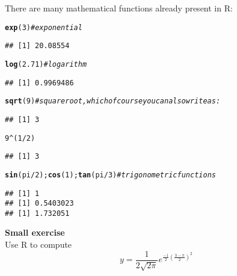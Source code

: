 \documentclass[12pt,a4paper]{scrartcl}\usepackage[]{graphicx}\usepackage[]{color}
\makeatletter
\newcommand{\hlnum}[1]{\textcolor[rgb]{0.686,0.059,0.569}{#1}}%
\newcommand{\hlcom}[1]{\textcolor[rgb]{0.678,0.584,0.686}{\textit{#1}}}%
\newcommand{\hlopt}[1]{\textcolor[rgb]{0,0,0}{#1}}%
\newcommand{\hlstd}[1]{\textcolor[rgb]{0.345,0.345,0.345}{#1}}%
\newcommand{\hlkwd}[1]{\textcolor[rgb]{0.737,0.353,0.396}{\textbf{#1}}}%
\newenvironment{kframe}{%
 \def\at@end@of@kframe{}%
 \ifinner\ifhmode%
  \def\at@end@of@kframe{\end{minipage}}%
  \begin{minipage}{\columnwidth}%
 \fi\fi%
 \def\FrameCommand##1{\hskip\@totalleftmargin \hskip-\fboxsep
 \colorbox{shadecolor}{##1}\hskip-\fboxsep
     \hskip-\linewidth \hskip-\@totalleftmargin \hskip\columnwidth}%
 \MakeFramed {\advance\hsize-\width
   \@totalleftmargin\z@ \linewidth\hsize
   \@setminipage}}%
 {\par\unskip\endMakeFramed%
 \at@end@of@kframe}
\newenvironment{knitrout}{}{} %
\makeatother
\begin{document}
There are many mathematical functions already present in R:
\begin{knitrout}
\color{fgcolor}\begin{kframe}
\begin{alltt}
\hlkwd{exp}\hlstd{(}\hlnum{3}\hlstd{)} \hlcom{#exponential}
\end{alltt}
\begin{verbatim}
## [1] 20.08554
\end{verbatim}
\begin{alltt}
\hlkwd{log}\hlstd{(}\hlnum{2.71}\hlstd{)} \hlcom{#logarithm}
\end{alltt}
\begin{verbatim}
## [1] 0.9969486
\end{verbatim}
\begin{alltt}
\hlkwd{sqrt}\hlstd{(}\hlnum{9}\hlstd{)} \hlcom{#square root, which of course you can also write as:}
\end{alltt}
\begin{verbatim}
## [1] 3
\end{verbatim}
\begin{alltt}
\hlnum{9} \hlopt{^} \hlstd{(}\hlnum{1}\hlopt{/}\hlnum{2}\hlstd{)}
\end{alltt}
\begin{verbatim}
## [1] 3
\end{verbatim}
\begin{alltt}
\hlkwd{sin}\hlstd{(pi}\hlopt{/}\hlnum{2}\hlstd{);} \hlkwd{cos}\hlstd{(}\hlnum{1}\hlstd{);} \hlkwd{tan}\hlstd{(pi}\hlopt{/}\hlnum{3}\hlstd{)} \hlcom{#trigonometric functions}
\end{alltt}
\begin{verbatim}
## [1] 1
## [1] 0.5403023
## [1] 1.732051
\end{verbatim}
\end{kframe}
\end{knitrout}

\begin{mdframed}
\textbf{Small exercise}\\
Use R to compute
$$
  y = \frac{1}{2\sqrt{2\pi}} e^{\frac{-1}{2} (\frac{3-\pi}{2})^2}
$$



\end{mdframed}
\end{document}
